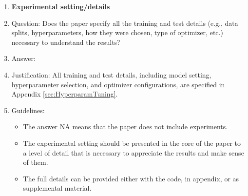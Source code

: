 \documentclass{article}
\theoremstyle{remark}
\begin{document}
\begin{enumerate}
\item {\bf Experimental setting/details}
    \item[] Question: Does the paper specify all the training and test details (e.g., data splits, hyperparameters, how they were chosen, type of optimizer, etc.) necessary to understand the results?
    \item[] Answer: \answerYes{} %
    \item[] Justification: All training and test details, including model setting, hyperparameter selection, and optimizer configurations, are specified in Appendix \ref{sec:HyperparamTuning}.
    \item[] Guidelines:
    \begin{itemize}
        \item The answer NA means that the paper does not include experiments.
        \item The experimental setting should be presented in the core of the paper to a level of detail that is necessary to appreciate the results and make sense of them.
        \item The full details can be provided either with the code, in appendix, or as supplemental material.
    \end{itemize}


\end{enumerate}
\end{document}
